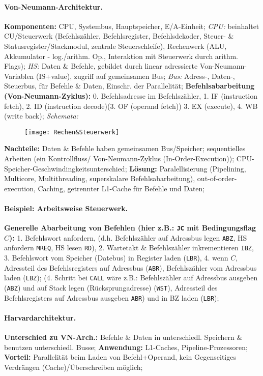 \documentclass[8pt,a4paper]{article}
\begin{document}
\begin{multicols}{2}
\paragraph{Von-Neumann-Architektur.} \textbf{Komponenten:} CPU,
Systembus, Hauptspeicher, E/A-Einheit; \emph{CPU:} beinhaltet
CU/Steuerwerk (Befehlszähler, Befehlsregister, Befehlsdekoder, Steuer-
\& Statusregister/Stackmodul, zentrale Steuerschleife), Rechenwerk
(ALU, Akkumulator - log./arithm. Op., Interaktion mit Steuerwerk durch
arithm. Flags); \emph{HS:} Daten \& Befehle, gebildet durch linear
adressierte Von-Neumann-Variablen (IS+value), zugriff auf gemeinsamen
Bus; \emph{Bus:} Adress-, Daten-, Steuerbus, für Befehle \& Daten,
Einschr. der Parallelität; \textbf{Befehlsabarbeitung (Von-Neumann-Zyklus):}
0. Befehlsadresse im Befehlszähler, 1. IF (instruction fetch), 2. ID
(instruction decode)(3. OF (operand fetch)) 3. EX (execute), 4. WB
(write back);
\emph{Schemata:}
\begin{figure}[H]
  \centering
  \texttt{[image: Rechen\&Steuerwerk]}
\end{figure}
\textbf{Nachteile:} Daten \& Befehle haben gemeinsamen Bus/Speicher;
sequentielles Arbeiten (ein Kontrollfluss/ Von-Neumann-Zyklus (In-Order-Execution));
CPU-Speicher-Geschwindingkeitsunterschied; \textbf{Lösung:}
Paralellisierung (Pipelining, Multicore, Multithreading, superskalare Befehlsabarbeitung), out-of-order-execution,
Caching, getrennter L1-Cache für Befehle und Daten; 

\paragraph{Beispiel: Arbeitsweise Steuerwerk.} \textbf{Generelle Abarbeitung von Befehlen (hier z.B.: \texttt{JC} mit Bedingungsflag $C$):} 1. Befehlswort anfordern, (d.h. Befehlszähler auf Adressbus legen \texttt{ABZ}, HS anfordern \texttt{MREQ}, HS lesen \texttt{RD}), 2. Wartetakt \& Befehlszähler inkrementieren \texttt{IBZ}, 3. Befehlswort vom Speicher (Datebus) in Register laden (\texttt{LBR}), 4. wenn $C$, Adressteil des Befehlsregisters auf Adressbus (\texttt{ABR}), Befehlszähler vom Adressbus laden (\texttt{LBZ}); (4. Schritt bei \texttt{CALL} wäre z.B.: Befehlszähler auf Adressbus ausgeben (\texttt{ABZ}) und auf Stack legen (Rücksprungadresse) (\texttt{WST}), Adressteil des Befehlsregisters auf Adressbus ausgeben \texttt{ABR}) und in BZ laden (\texttt{LBR});

\paragraph{Harvardarchitektur.} \textbf{Unterschied zu VN-Arch.:}
Befehle \& Daten in unterschiedl. Speichern \& benutzen
unterschiedl. Busse; \textbf{Anwendung:} L1-Caches,
Pipeline-Prozessoren; \textbf{Vorteil:} Parallelität beim Laden von
Befehl+Operand, kein Gegenseitiges Verdrängen (Cache)/Überschreiben möglich;



\end{multicols}
\end{document}
